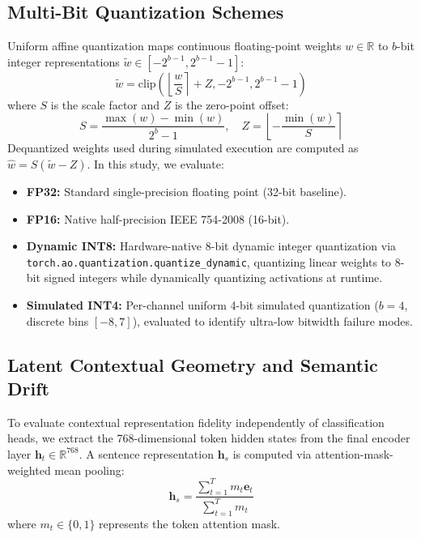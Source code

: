 \documentclass[conference]{IEEEtran}
\begin{document}
\subsection{Multi-Bit Quantization Schemes}
Uniform affine quantization maps continuous floating-point weights $w \in \mathbb{R}$ to $b$-bit integer representations $\tilde{w} \in [-2^{b-1}, 2^{b-1}-1]$:
\begin{equation}
\tilde{w} = \text{clip}\left( \left\lfloor \frac{w}{S} \right\rceil + Z, -2^{b-1}, 2^{b-1}-1 \right)
\label{eq:quantization}
\end{equation}
where $S$ is the scale factor and $Z$ is the zero-point offset:
\begin{equation}
S = \frac{\max(w) - \min(w)}{2^b - 1}, \quad Z = \left\lfloor -\frac{\min(w)}{S} \right\rceil
\end{equation}
Dequantized weights used during simulated execution are computed as $\hat{w} = S(\tilde{w} - Z)$. In this study, we evaluate:
\begin{itemize}
    \item \textbf{FP32:} Standard single-precision floating point (32-bit baseline).
    \item \textbf{FP16:} Native half-precision IEEE 754-2008 (16-bit).
    \item \textbf{Dynamic INT8:} Hardware-native 8-bit dynamic integer quantization via \texttt{torch.ao.quantization.quantize\_dynamic}, quantizing linear weights to 8-bit signed integers while dynamically quantizing activations at runtime.
    \item \textbf{Simulated INT4:} Per-channel uniform 4-bit simulated quantization ($b=4$, discrete bins $[-8, 7]$), evaluated to identify ultra-low bitwidth failure modes.
\end{itemize}

\subsection{Latent Contextual Geometry and Semantic Drift}
To evaluate contextual representation fidelity independently of classification heads, we extract the 768-dimensional token hidden states from the final encoder layer $\mathbf{h}_t \in \mathbb{R}^{768}$. A sentence representation $\mathbf{h}_s$ is computed via attention-mask-weighted mean pooling:
\begin{equation}
\mathbf{h}_s = \frac{\sum_{t=1}^{T} m_t \mathbf{e}_t}{\sum_{t=1}^{T} m_t}
\label{eq:mean_pooling}
\end{equation}
where $m_t \in \{0, 1\}$ represents the token attention mask.
\end{document}
